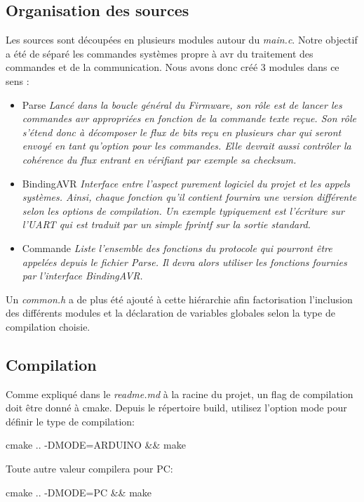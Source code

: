 \subsection{Organisation des sources}
Les sources sont découpées en plusieurs modules autour du \textit{main.c}. Notre
objectif a été de séparé les commandes systèmes propre à avr du traitement des commandes
et de la communication. Nous avons donc créé 3 modules dans ce sens :
\begin{itemize}
\item Parse 
  { 
    \it 
    Lancé dans la boucle général du Firmware, son rôle est de lancer
    les commandes avr appropriées en fonction de la commande texte reçue. Son rôle s'étend 
    donc à décomposer le flux de bits reçu en plusieurs char qui seront envoyé en tant 
    qu'option pour les commandes. Elle devrait aussi contrôler la cohérence du flux entrant
    en vérifiant par exemple sa checksum.
  }
\item BindingAVR
  {
    \it
    Interface entre l'aspect purement logiciel du projet et les appels systèmes. Ainsi,
    chaque fonction qu'il contient fournira une version différente selon les options de 
    compilation. Un exemple typiquement est l'écriture sur l'UART qui est traduit par un 
    simple fprintf sur la sortie standard.
  }
\item Commande
  {
    \it
    Liste l'ensemble des fonctions du protocole qui pourront être appelées depuis le fichier 
    Parse. Il devra alors utiliser les fonctions fournies par l'interface BindingAVR.
  }
\end{itemize}

Un \textit{common.h} a de plus été ajouté à cette hiérarchie afin factorisation l'inclusion des
différents modules et la déclaration de variables globales selon la type de compilation
choisie.\\


\subsection{Compilation}
Comme expliqué dans le \textit{readme.md} à la racine du projet, un flag de compilation doit
être donné à cmake. Depuis le répertoire build, utilisez l'option mode pour définir le type
de compilation:
\begin{center} cmake .. -DMODE=ARDUINO \&\& make\end{center}

Toute autre valeur compilera pour PC:
\begin{center} cmake .. -DMODE=PC \&\& make\end{center}
